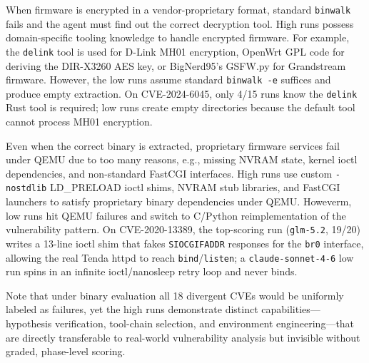  When firmware is encrypted in a vendor-proprietary format, standard \texttt{binwalk} fails and the agent must find out the correct decryption tool. High runs possess domain-specific tooling knowledge to handle encrypted firmware. For example, the \texttt{delink} tool is used for D-Link MH01 encryption, OpenWrt GPL code for deriving the DIR-X3260 AES key, or BigNerd95's GSFW.py for Grandstream firmware. However, the low runs assume standard \texttt{binwalk -e} suffices and produce empty extraction. On CVE-2024-6045, only 4/15 runs know the \texttt{delink} Rust tool is required; low runs create empty directories because the default tool cannot process MH01 encryption.

 Even when the correct binary is extracted, proprietary firmware services fail under QEMU due to too many reasons, e.g., missing NVRAM state, kernel ioctl dependencies, and non-standard FastCGI interfaces. High runs use custom \texttt{-nostdlib} LD\_PRELOAD ioctl shims, NVRAM stub libraries, and FastCGI launchers to satisfy proprietary binary dependencies under QEMU. Howeverm, low runs hit QEMU failures and switch to C/Python reimplementation of the vulnerability pattern. On CVE-2020-13389, the top-scoring run (\texttt{glm-5.2}, 19/20) writes a 13-line ioctl shim that fakes \texttt{SIOCGIFADDR} responses for the \texttt{br0} interface, allowing the real Tenda httpd to reach \texttt{bind}/\texttt{listen}; a \texttt{claude-sonnet-4-6} low run spins in an infinite ioctl/nanosleep retry loop and never binds.

Note that under binary evaluation all 18 divergent CVEs would be uniformly labeled as failures, yet the high runs demonstrate distinct capabilities---hypothesis verification, tool-chain selection, and environment engineering---that are directly transferable to real-world vulnerability analysis but invisible without graded, phase-level scoring.




